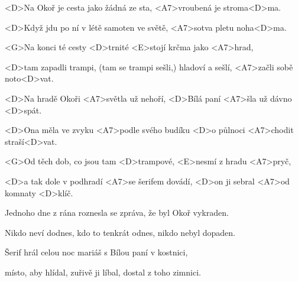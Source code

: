 

\zs
<D>Na Okoř je cesta jako žádná ze sta, <A7>vroubená je stroma<D>ma.

<D>Když jdu po ní v létě samoten ve světě, <A7>sotva pletu noha<D>ma.

<G>Na konci té cesty <D>trnité <E>stojí krčma jako <A7>hrad,

<D>tam zapadli trampi, (tam se trampi sešli,) hladoví a sešlí, <A7>začli sobě noto<D>vat.
\ks

\zr
<D>Na hradě Okoři <A7>světla už nehoří, <D>Bílá paní <A7>šla už dávno <D>spát.

<D>Ona měla ve zvyku <A7>podle svého budíku <D>o půlnoci <A7>chodit straší<D>vat.

<G>Od těch dob, co jsou tam <D>trampové, <E>nesmí z hradu <A7>pryč,

<D>a tak dole v podhradí <A7>se šerifem dovádí, <D>on ji sebral <A7>od komnaty <D>klíč.
\kr

\zs
Jednoho dne z rána roznesla se zpráva, že byl Okoř vykraden.

Nikdo neví dodnes, kdo to tenkrát odnes, nikdo nebyl dopaden.

Šerif hrál celou noc mariáš s Bílou paní v kostnici,

místo, aby hlídal, zuřivě ji líbal, dostal z toho zimnici.
\ks

\zr \kr

\kp
